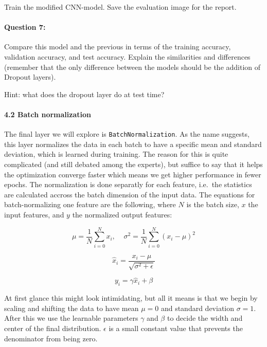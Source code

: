 \documentclass[11pt]{article}
\begin{document}
Train the modified CNN-model. Save the evaluation image for the report.

    \hypertarget{question-7}{%
\paragraph{\texorpdfstring{\textbf{{Question
7:}}}{Question 7:}}\label{question-7}}

Compare this model and the previous in terms of the training accuracy,
validation accuracy, and test accuracy. Explain the similarities and
differences (remember that the only difference between the models should
be the addition of Dropout layers).

Hint: what does the dropout layer do at test time?

    \hypertarget{batch-normalization}{%
\paragraph{\texorpdfstring{\textbf{4.2 Batch
normalization}}{4.2 Batch normalization}}\label{batch-normalization}}

The final layer we will explore is \texttt{BatchNormalization}. As the
name suggests, this layer normalizes the data in each batch to have a
specific mean and standard deviation, which is learned during training.
The reason for this is quite complicated (and still debated among the
experts), but suffice to say that it helps the optimization converge
faster which means we get higher performance in fewer epochs. The
normalization is done separatly for each feature, i.e.~the statistics
are calculated accross the batch dimension of the input data. The
equations for batch-normalizing one feature are the following, where
\(N\) is the batch size, \(x\) the input features, and \(y\) the
normalized output features:

\[ \mu = \frac{1}{N} \sum_{i=0}^{N}x_i,\;\;\;\; \sigma^2 = \frac{1}{N} \sum_{i=0}^{N}(x_i - \mu)^2 \]

\[ \hat{x}_i = \frac{x_i - \mu}{\sqrt{\sigma^2 + \epsilon}} \]

\[ y_i = \gamma \hat{x}_i + \beta \]

At first glance this might look intimidating, but all it means is that
we begin by scaling and shifting the data to have mean \(\mu=0\) and
standard deviation \(\sigma=1\). After this we use the learnable
parameters \(\gamma\) and \(\beta\) to decide the width and center of
the final distribution. \(\epsilon\) is a small constant value that
prevents the denominator from being zero.
\end{document}
